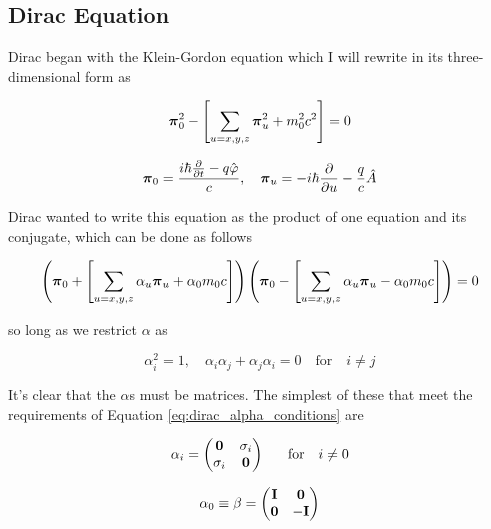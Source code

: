 \documentclass[12pt]{report}
\begin{document}
\subsection{Dirac Equation}

Dirac\cite{Dirac610} began with the Klein-Gordon equation which I will rewrite in its three-dimensional form as

\begin{equation}
\label{eq:dirac_3D}
{\bf{\pi}}_{0}^{2} - \left[\sum_{u=x,y,z}{\bf{\pi}}_{u}^{2} + m_{0}^{2}c^{2}\right] = 0
\end{equation}

\begin{equation}
\label{eq:dirac_3D_def}
{\bf{\pi}}_{0} = \frac{i\hbar\frac{\partial}{\partial t} -q\hat{\varphi}}{c}, \quad {\bf{\pi}}_{u} = -i\hbar\frac{\partial}{\partial u} - \frac{q}{c}\hat{A}
\end{equation}

Dirac wanted to write this equation as the product of one equation and its conjugate, which can be done as follows

\begin{equation}
\label{eq:dirac_3D_conj}
\left({\bf{\pi}}_{0} + \left[\sum_{u=x,y,z}\alpha_{u}{\bf{\pi}}_{u} + \alpha_{0}m_{0}c\right]\right)\left({\bf{\pi}}_{0} - \left[\sum_{u=x,y,z}\alpha_{u}{\bf{\pi}}_{u} - \alpha_{0}m_{0}c\right]\right) = 0
\end{equation}

so long as we restrict $\alpha$ as

\begin{equation}
\label{eq:dirac_alpha_conditions}
\alpha^{2}_{i} = 1, \quad \alpha_{i}\alpha_{j} + \alpha_{j}\alpha_{i} = 0 \quad \text{for} \quad i \neq j
\end{equation}

It's clear that the $\alpha$s must be matrices. The simplest of these that meet the requirements of Equation \ref{eq:dirac_alpha_conditions} are

\begin{equation}
\label{eq:dirac_alpha_matrix}
\alpha_{i} = 
\begin{pmatrix}
{\bf{0}}	&	\sigma_{i}	\\
\sigma_{i}	&	{\bf{0}}	\\
\end{pmatrix} 
\quad \text{for} \quad i \neq 0
\end{equation}

\begin{equation}
\label{eq:dirac_beta_matrix}
\alpha_{0} \equiv \beta = 
\begin{pmatrix}
{\bf{I}}	&	{\bf{0}}	\\
{\bf{0}}	&	-{\bf{I}}	\\
\end{pmatrix} 
\end{equation}
\end{document}
